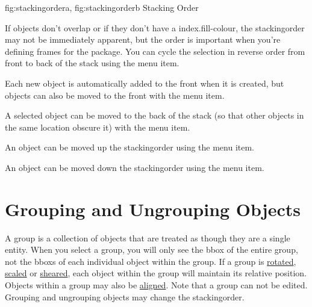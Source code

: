 {
  {fig:stackingordera}{}{},
  {fig:stackingorderb}{}{}
}
{Stacking Order}

If \glspl{object} don't overlap or if they don't have a
\gls{index.fill-colour}, the \gls{stackingorder} may not be
immediately apparent, but the order is important when you're
defining frames for the  package. You can cycle the
selection in reverse order from front to back of the stack using the
 menu item.


Each new \gls{object} is automatically added to the \gls{front} when it is
created, but \glspl{object} can also be moved to the \gls{front} 
with the  menu item.


A selected \gls{object} can be moved to the
\gls{back} of the \gls{stack} (so that other \glspl{object} in the
same location obscure it) with the  menu item.


An object can be moved up the \gls{stackingorder} using
the  menu item.


An object can be moved down the \gls{stackingorder} using
the  menu item.


\section{Grouping and Ungrouping Objects}\label{sec:grouping}

A \gls{group} is a collection of \glspl{object} that are treated as
though they are a single entity. When you select a \gls{group}, you
will only see the \gls{bbox} of the entire group, not the
\glspl*{bbox} of each individual object within the group. If a
\gls{group} is \hyperref[sec:rotateobjects]{rotated},
\hyperref[sec:scaleobjects]{scaled} or \hyperref[sec:shearobjects]{sheared}, each
\gls*{object} within the group will maintain its relative position.
Objects within a \gls{group} may also be
\hyperref[sec:alignobjects]{aligned}.  Note that a \gls{group} can
not be edited. Grouping and ungrouping \glspl*{object} may change
the \gls{stackingorder}.


